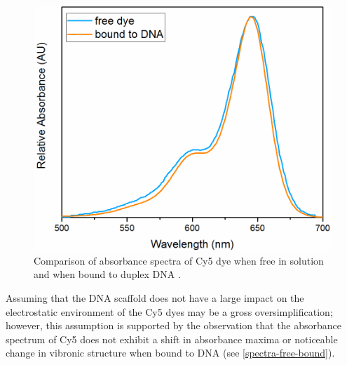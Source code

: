 \begin{figure}[h!]
  \centering
  \includegraphics[width=0.8\linewidth]{figures/pub1/free-vs-bound-cy5.pdf}
  \caption{Comparison of absorbance spectra of Cy5 dye when free in solution and when bound to duplex DNA \cite{Cannon2017, thermofisher}.}\label{spectra-free-bound}
\end{figure}

Assuming that the DNA scaffold does not have a large impact on the electrostatic environment of the Cy5 dyes may be a gross oversimplification; however, this assumption is supported by the observation that the absorbance spectrum of Cy5 does not exhibit a shift in absorbance maxima or noticeable change in vibronic structure when bound to DNA (see \autoref{spectra-free-bound}).


